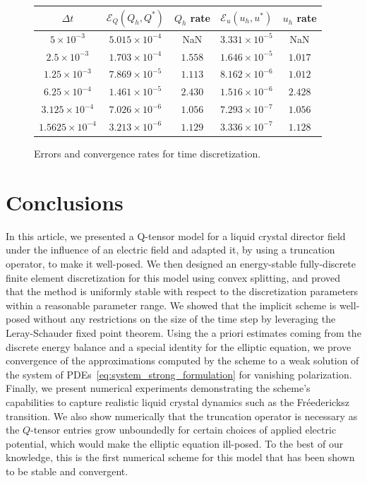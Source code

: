 \documentclass[10pt,letterpaper]{amsart}
\theoremstyle{definition}{\newtheorem{definition}[lemma]{Definition}}
\theoremstyle{note}{\newtheorem{claim}{Claim}[section]
\newtheorem*{claim*}{Claim}}
\numberwithin{equation}{section}
\begin{document}
\begin{figure}[H]
\centering
\begin{tabular}{|c|c|c|c|c|}
    \hline
    $\Delta t$ & $\mathcal{E}_Q(Q_h, Q^\ast)$ & $Q_h$ rate & $\mathcal{E}_u(u_h, u^\ast)$ & $u_h$ rate \\
    \hline
    $5\times 10^{-3}$ & $5.015\times 10^{-4}$ & NaN & $3.331\times 10^{-5}$ & NaN\\
    \hline
    $2.5\times 10^{-3}$ & $1.703\times 10^{-4}$ & $1.558$ & $1.646\times 10^{-5}$ & $1.017$\\
    \hline
    $1.25\times 10^{-3}$ & $7.869\times 10^{-5}$ & $1.113$ & $8.162\times 10^{-6}$ & $1.012$\\
    \hline
    $6.25\times 10^{-4}$ & $1.461\times 10^{-5}$ & $2.430$ & $1.516\times 10^{-6}$ & $2.428$\\
    \hline
    $3.125\times 10^{-4}$ & $7.026\times 10^{-6}$ & $1.056$ & $7.293\times 10^{-7}$ & $1.056$\\
    \hline
    $1.5625\times 10^{-4}$ & $3.213\times 10^{-6}$ & $1.129$ & $3.336\times 10^{-7}$ & $1.128$\\
    \hline
\end{tabular}
\caption{Errors and convergence rates for time discretization.}
\label{fig:time-convergence}
\end{figure}



\section{Conclusions}
In this article, we presented a Q-tensor model for a liquid crystal director field under the influence of an electric field and adapted it, by using a truncation operator, to make it well-posed. We then designed an energy-stable fully-discrete finite element discretization for this model using convex splitting, and proved that the method is uniformly stable with respect to the discretization parameters within a reasonable parameter range. We showed that the implicit scheme is well-posed without any restrictions on the size of the time step by leveraging the Leray-Schauder fixed point theorem. Using the a priori estimates coming from the discrete energy balance and a special identity for the elliptic equation, we prove convergence of the approximations computed by the scheme to a weak solution of the system of PDEs~\eqref{eq:system_strong_formulation} for vanishing polarization. Finally, we present numerical experiments demonstrating the scheme's capabilities to capture realistic liquid crystal dynamics such as the Fr\'{e}edericksz transition. We also show numerically that the truncation operator is necessary as the $Q$-tensor entries grow unboundedly for certain choices of applied electric potential, which would make the elliptic equation ill-posed. To the best of our knowledge, this is the first numerical scheme for this model that has been shown to be stable and convergent.
\end{document}
